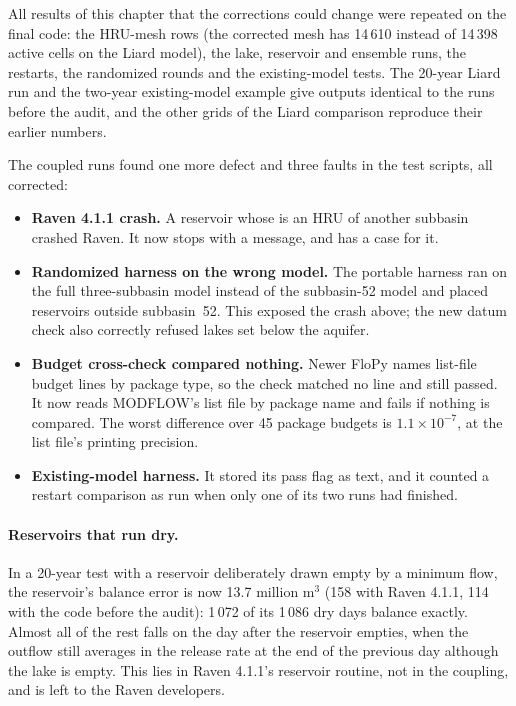 All results of this chapter that the corrections could change were repeated on the final code: the HRU-mesh rows (the
corrected mesh has 14\,610 instead of 14\,398 active cells on the Liard model), the lake, reservoir and ensemble runs, the
restarts, the randomized rounds and the existing-model tests. The 20-year Liard run and the two-year existing-model example give
outputs identical to the runs before the audit, and the other grids of the Liard comparison reproduce their earlier numbers.

The coupled runs found one more defect and three faults in the test scripts, all corrected:
\begin{itemize}
\item \textbf{Raven 4.1.1 crash.} A reservoir whose  is an HRU of another subbasin crashed Raven. It now stops with
a message, and  has a case for it.
\item \textbf{Randomized harness on the wrong model.} The portable harness ran on the full three-subbasin model instead of the
subbasin-52 model and placed reservoirs outside subbasin~52. This exposed the crash above; the new datum check also correctly
refused lakes set below the aquifer.
\item \textbf{Budget cross-check compared nothing.} Newer FloPy names list-file budget lines by package type, so the check
matched no line and still passed. It now reads MODFLOW's list file by package name and fails if nothing is compared. The worst
difference over 45 package budgets is $1.1\times10^{-7}$, at the list file's printing precision.
\item \textbf{Existing-model harness.} It stored its pass flag as text, and it counted a restart comparison as run when only one
of its two runs had finished.
\end{itemize}

\paragraph{Reservoirs that run dry.} In a 20-year test with a reservoir deliberately drawn empty by a minimum flow, the
reservoir's balance error is now 13.7 million m$^3$ (158 with Raven 4.1.1, 114 with the code before the audit): 1\,072 of
its 1\,086 dry days balance exactly. Almost all
of the rest falls on the day after the reservoir empties, when the outflow still averages in the release rate at the end of
the previous day although the lake is empty. This lies in Raven 4.1.1's reservoir routine, not in the coupling, and is left
to the Raven developers.

